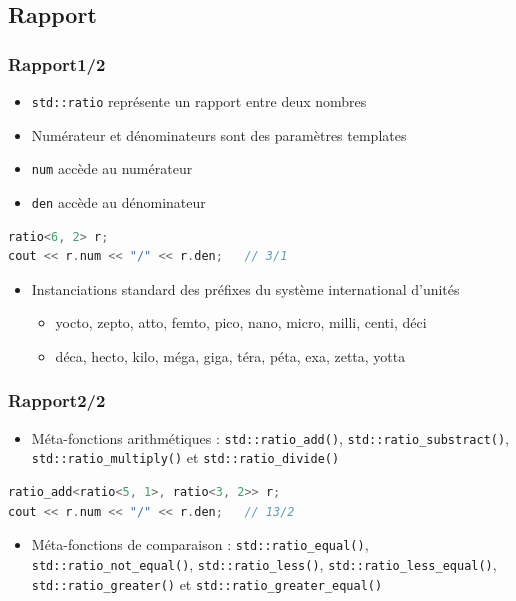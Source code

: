 \documentclass[C++.tex]{subfiles}
\begin{document}
\subsection*{Rapport}
\begin{frame}[fragile]
	\frametitle{Rapport\titlehfill{}1/2}


	\begin{itemize}
		\item \lstinline|std::ratio| représente un rapport entre deux nombres
		\item Numérateur et dénominateurs sont des paramètres templates
		\item \lstinline|num| accède au numérateur
		\item \lstinline|den| accède au dénominateur
	\end{itemize}

	\begin{lstlisting}[language=C++]
ratio<6, 2> r;
cout << r.num << "/" << r.den;   // 3/1\end{lstlisting}

	\begin{itemize}
		\item Instanciations standard des préfixes du système international d'unités
		\begin{itemize}
			\item yocto, zepto, atto, femto, pico, nano, micro, milli, centi, déci
			\item déca, hecto, kilo, méga, giga, téra, péta, exa, zetta, yotta
		\end{itemize}
	\end{itemize}
\end{frame}

\begin{frame}[fragile]
	\frametitle{Rapport\titlehfill{}2/2}
	\begin{itemize}
		\item Méta-fonctions arithmétiques : \lstinline|std::ratio_add()|, \lstinline|std::ratio_substract()|, \lstinline|std::ratio_multiply()| et \lstinline|std::ratio_divide()|

	\end{itemize}

	\begin{lstlisting}[language=C++]
ratio_add<ratio<5, 1>, ratio<3, 2>> r;
cout << r.num << "/" << r.den;   // 13/2\end{lstlisting}

	\begin{itemize}
		\item Méta-fonctions de comparaison : \lstinline|std::ratio_equal()|, \lstinline|std::ratio_not_equal()|, \lstinline|std::ratio_less()|, \lstinline|std::ratio_less_equal()|, \lstinline|std::ratio_greater()| et \lstinline|std::ratio_greater_equal()|
	\end{itemize}
\end{frame}
\end{document}
